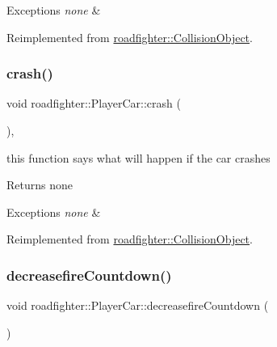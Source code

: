 \begin{DoxyExceptions}{Exceptions}
{\em none} & \\
\hline
\end{DoxyExceptions}


Reimplemented from \hyperlink{classroadfighter_1_1CollisionObject_a9eba85551432f548f2a0c20217a60f42}{roadfighter\+::\+Collision\+Object}.

\mbox{\label{classroadfighter_1_1PlayerCar_a330d071af729d7afbfcfd7ef92516544}} 
\subsubsection{\texorpdfstring{crash()}{crash()}}
{\footnotesize\ttfamily void roadfighter\+::\+Player\+Car\+::crash (\begin{DoxyParamCaption}{ }\end{DoxyParamCaption})\hspace{0.3cm}{\ttfamily [override]}, {\ttfamily [virtual]}}

this function says what will happen if the car crashes \begin{DoxyReturn}{Returns}
none 
\end{DoxyReturn}

\begin{DoxyExceptions}{Exceptions}
{\em none} & \\
\hline
\end{DoxyExceptions}


Reimplemented from \hyperlink{classroadfighter_1_1CollisionObject_a9a5265d810f0ed7583b60046ab3fa88c}{roadfighter\+::\+Collision\+Object}.

\mbox{\label{classroadfighter_1_1PlayerCar_a65725265e5af175119a4c87be9a74cfe}} 
\subsubsection{\texorpdfstring{decreasefire\+Countdown()}{decreasefireCountdown()}}
{\footnotesize\ttfamily void roadfighter\+::\+Player\+Car\+::decreasefire\+Countdown (\begin{DoxyParamCaption}{ }\end{DoxyParamCaption})}

